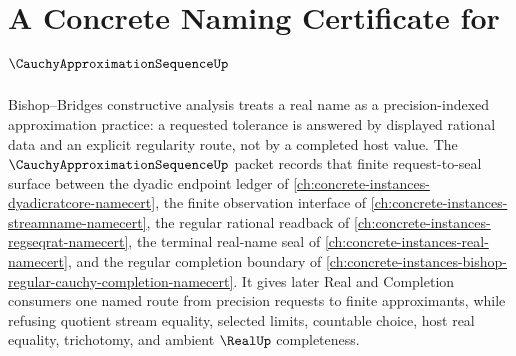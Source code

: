 \chapter{A Concrete Naming Certificate for $\CauchyApproximationSequenceUp$}
\label{ch:concrete-instances-cauchy-approximation-sequence-namecert}

Bishop--Bridges constructive analysis treats a real name as a precision-indexed approximation practice: a requested tolerance is answered by displayed rational data and an explicit regularity route, not by a completed host value. The $\CauchyApproximationSequenceUp$ packet records that finite request-to-seal surface between the dyadic endpoint ledger of \autoref{ch:concrete-instances-dyadicratcore-namecert}, the finite observation interface of \autoref{ch:concrete-instances-streamname-namecert}, the regular rational readback of \autoref{ch:concrete-instances-regseqrat-namecert}, the terminal real-name seal of \autoref{ch:concrete-instances-real-namecert}, and the regular completion boundary of \autoref{ch:concrete-instances-bishop-regular-cauchy-completion-namecert}. It gives later Real and Completion consumers one named route from precision requests to finite approximants, while refusing quotient stream equality, selected limits, countable choice, host real equality, trichotomy, and ambient $\RealUp$ completeness.


